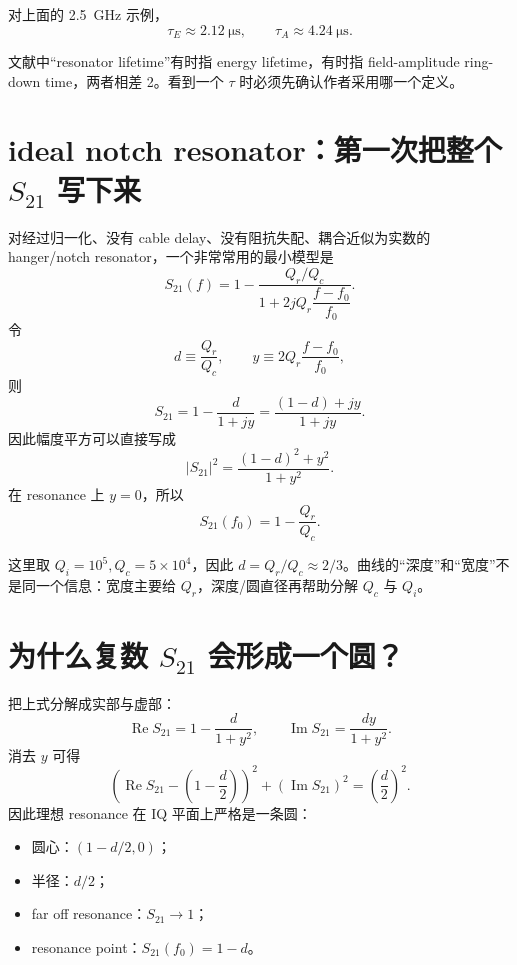 \documentclass[11pt,a4paper,openany]{ctexrep}
\begin{document}
对上面的 \SI{2.5}{GHz} 示例，
\[
\tau_E\approx\SI{2.12}{\micro\second},
\qquad
\tau_A\approx\SI{4.24}{\micro\second}.
\]

\begin{mistakebox}
文献中“resonator lifetime”有时指 energy lifetime，有时指 field-amplitude ring-down time，两者相差 2。看到一个 $\tau$ 时必须先确认作者采用哪一个定义。
\end{mistakebox}

\section{ideal notch resonator：第一次把整个 $S_{21}$ 写下来}

对经过归一化、没有 cable delay、没有阻抗失配、耦合近似为实数的 hanger/notch resonator，一个非常常用的最小模型是
\[
\boxed{
S_{21}(f)
=1-
\frac{Q_r/Q_c}
{1+2jQ_r\dfrac{f-f_0}{f_0}}.
}
\]
令
\[
d\equiv\frac{Q_r}{Q_c},
\qquad
y\equiv2Q_r\frac{f-f_0}{f_0},
\]
则
\[
S_{21}=1-\frac{d}{1+jy}
=\frac{(1-d)+jy}{1+jy}.
\]
因此幅度平方可以直接写成
\[
\boxed{
|S_{21}|^2=\frac{(1-d)^2+y^2}{1+y^2}.
}
\]
在 resonance 上 $y=0$，所以
\[
\boxed{
S_{21}(f_0)=1-\frac{Q_r}{Q_c}.
}
\]

\begin{center}
\end{center}

这里取 $Q_i=10^5,Q_c=5\times10^4$，因此 $d=Q_r/Q_c\approx2/3$。曲线的“深度”和“宽度”不是同一个信息：宽度主要给 $Q_r$，深度/圆直径再帮助分解 $Q_c$ 与 $Q_i$。

\section{为什么复数 $S_{21}$ 会形成一个圆？}

把上式分解成实部与虚部：
\[
\operatorname{Re}S_{21}=1-\frac{d}{1+y^2},
\qquad
\operatorname{Im}S_{21}=\frac{dy}{1+y^2}.
\]
消去 $y$ 可得
\[
\boxed{
\left(\operatorname{Re}S_{21}-\left(1-\frac d2\right)\right)^2
+
\left(\operatorname{Im}S_{21}\right)^2
=
\left(\frac d2\right)^2.
}
\]
因此理想 resonance 在 IQ 平面上严格是一条圆：
\begin{itemize}
  \item 圆心：$\left(1-d/2,0\right)$；
  \item 半径：$d/2$；
  \item far off resonance：$S_{21}\rightarrow1$；
  \item resonance point：$S_{21}(f_0)=1-d$。
\end{itemize}
\end{document}
